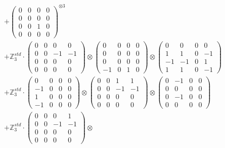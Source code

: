 \documentclass{article}
\begin{document}
{\begin{align}
        &+ \label{Rs16-Rc11-Solution-24-c16} \begin{pmatrix} 0 & 0 & 0 & 0 \\ 0 & 0 & 0 & 0 \\ 0 & 0 & 1 & 0 \\ 0 & 0 & 0 & 0 \end{pmatrix}^{\otimes 3} \\
        &+ \label{Rs16-Rc11-Solution-24-c17} \mathbb{Z}_3^{std} \cdot 
            \begin{pmatrix} 0 & 0 & 0 & 0 \\ 0 & 0 & -1 & -1 \\ 0 & 0 & 0 & 0 \\ 0 & 0 & 0 & 0 \end{pmatrix} \otimes 
            \begin{pmatrix} 0 & 0 & 0 & 0 \\ 0 & 0 & 0 & 0 \\ 0 & 0 & 0 & 0 \\ -1 & 0 & 1 & 0 \end{pmatrix} \otimes 
            \begin{pmatrix} 0 & 0 & 0 & 0 \\ 1 & 1 & 0 & -1 \\ -1 & -1 & 0 & 1 \\ 1 & 1 & 0 & -1 \end{pmatrix} \\ 
        &+ \label{Rs16-Rc11-Solution-24-c18} \mathbb{Z}_3^{std} \cdot 
            \begin{pmatrix} 0 & 0 & 0 & 0 \\ -1 & 0 & 0 & 0 \\ 1 & 0 & 0 & 0 \\ -1 & 0 & 0 & 0 \end{pmatrix} \otimes 
            \begin{pmatrix} 0 & 0 & 1 & 1 \\ 0 & 0 & -1 & -1 \\ 0 & 0 & 0 & 0 \\ 0 & 0 & 0 & 0 \end{pmatrix} \otimes 
            \begin{pmatrix} 0 & -1 & 0 & 0 \\ 0 & 0 & 0 & 0 \\ 0 & -1 & 0 & 0 \\ 0 & 0 & 0 & 0 \end{pmatrix} \\ 
        &+ \label{Rs16-Rc11-Solution-24-c19} \mathbb{Z}_3^{std} \cdot 
            \begin{pmatrix} 0 & 0 & 0 & 1 \\ 0 & 0 & -1 & -1 \\ 0 & 0 & 0 & 0 \\ 0 & 0 & 0 & 0 \end{pmatrix} \otimes 

\end{align}}
\end{document}
